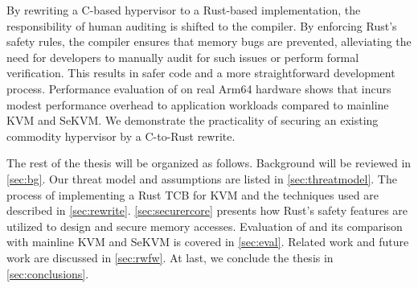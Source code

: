 By rewriting a C-based hypervisor to a Rust-based implementation,
the responsibility of human auditing is shifted to the compiler.
By enforcing Rust's safety rules, the compiler ensures that memory bugs are
prevented, alleviating the need for developers to manually audit for such
issues or perform formal verification.
This results in safer code and a more straightforward development process.
Performance evaluation of \rustsec{} on real Arm64 hardware shows that
\rustsec{} incurs modest performance overhead to application workloads
compared to mainline KVM and SeKVM. We demonstrate the practicality of
securing an existing commodity hypervisor by a C-to-Rust rewrite.

The rest of the thesis will be organized as follows. Background
will be reviewed in \autoref{sec:bg}. Our threat model and assumptions are
listed in \autoref{sec:threatmodel}. The process of implementing a Rust TCB
for KVM and the techniques used are described in \autoref{sec:rewrite}.
\autoref{sec:securercore} presents how Rust's safety features are utilized to
design and secure \rustcore{} memory accesses.
Evaluation of \rustsec{} and its comparison with mainline KVM and SeKVM is
covered in \autoref{sec:eval}. Related work and future work are discussed in
\autoref{sec:rwfw}. At last, we conclude the thesis in
\autoref{sec:conclusions}.

